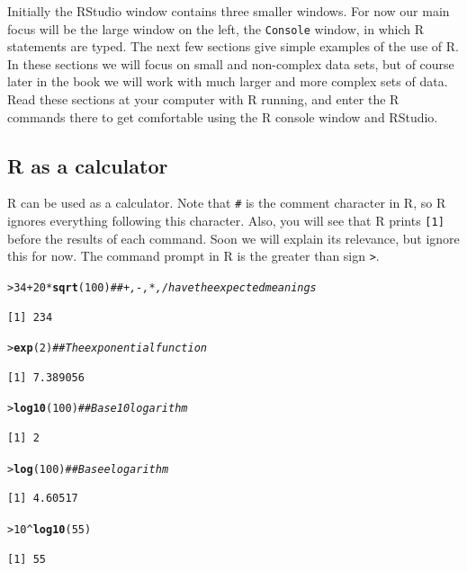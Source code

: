 \documentclass[12pt,oneside]{book}\usepackage[]{graphicx}\usepackage[]{color}
\makeatletter
\newcommand{\hlnum}[1]{\textcolor[rgb]{0.686,0.059,0.569}{#1}}%
\newcommand{\hlcom}[1]{\textcolor[rgb]{0.678,0.584,0.686}{\textit{#1}}}%
\newcommand{\hlopt}[1]{\textcolor[rgb]{0,0,0}{#1}}%
\newcommand{\hlstd}[1]{\textcolor[rgb]{0.345,0.345,0.345}{#1}}%
\newcommand{\hlkwd}[1]{\textcolor[rgb]{0.737,0.353,0.396}{\textbf{#1}}}%
\newenvironment{kframe}{%
 \def\at@end@of@kframe{}%
 \ifinner\ifhmode%
  \def\at@end@of@kframe{\end{minipage}}%
  \begin{minipage}{\columnwidth}%
 \fi\fi%
 \def\FrameCommand##1{\hskip\@totalleftmargin \hskip-\fboxsep
 \colorbox{shadecolor}{##1}\hskip-\fboxsep
     \hskip-\linewidth \hskip-\@totalleftmargin \hskip\columnwidth}%
 \MakeFramed {\advance\hsize-\width
   \@totalleftmargin\z@ \linewidth\hsize
   \@setminipage}}%
 {\par\unskip\endMakeFramed%
 \at@end@of@kframe}
\newenvironment{knitrout}{}{} %
\makeatother
\begin{document}
Initially the RStudio window contains three smaller windows. For now our main focus will be the large window on the left, the \verb+Console+ window, in which R statements are typed. The next few sections give simple examples of the use of R. In these sections we will focus on small and non-complex data sets, but of course later in the book we will work with much larger and more complex sets of data.  Read these sections at your computer with R running, and enter the R commands there to get comfortable using the R console window and RStudio.

\subsection{R as a calculator}
R can be used as a calculator. Note that \verb+#+ is the comment character in R, so R ignores everything following this character. Also, you will see that R prints \texttt{[1]} before the results of each command. Soon we will explain its relevance, but ignore this for now. The command prompt in R is the greater than sign \verb+>+. 
\begin{knitrout}
\color{fgcolor}\begin{kframe}
\begin{alltt}
\hlstd{> }\hlnum{34} \hlopt{+} \hlnum{20} \hlopt{*} \hlkwd{sqrt}\hlstd{(}\hlnum{100}\hlstd{)}  \hlcom{## +,-,*,/ have the expected meanings}
\end{alltt}
\begin{verbatim}
[1] 234
\end{verbatim}
\begin{alltt}
\hlstd{> }\hlkwd{exp}\hlstd{(}\hlnum{2}\hlstd{)}  \hlcom{##The exponential function}
\end{alltt}
\begin{verbatim}
[1] 7.389056
\end{verbatim}
\begin{alltt}
\hlstd{> }\hlkwd{log10}\hlstd{(}\hlnum{100}\hlstd{)}  \hlcom{##Base 10 logarithm}
\end{alltt}
\begin{verbatim}
[1] 2
\end{verbatim}
\begin{alltt}
\hlstd{> }\hlkwd{log}\hlstd{(}\hlnum{100}\hlstd{)}  \hlcom{##Base e logarithm}
\end{alltt}
\begin{verbatim}
[1] 4.60517
\end{verbatim}
\begin{alltt}
\hlstd{> }\hlnum{10}\hlopt{^}\hlkwd{log10}\hlstd{(}\hlnum{55}\hlstd{)}
\end{alltt}
\begin{verbatim}
[1] 55
\end{verbatim}
\end{kframe}
\end{knitrout}
\end{document}
